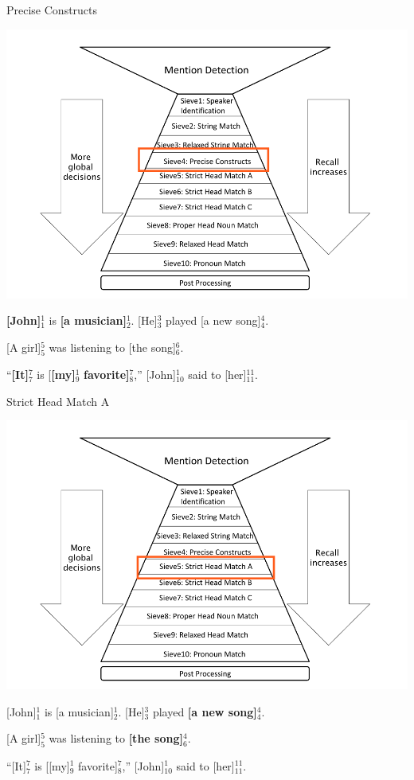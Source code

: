 \documentclass[11pt,a4paper]{beamer}
\begin{document}
\begin{frame}{Precise Constructs}

\includegraphics[scale=0.15]{sieve4.png} 
\bigskip

\textbf{[John]}$^{1}_{1}$ is \textbf{[a musician]}$^{1}_{2}$. [He]$^{3}_{3}$ played [a new song]$^{4}_{4}$.

[A girl]$^{5}_{5}$ was listening to [the song]$^{6}_{6}$.

“\textbf{[It]}$^{7}_{7}$ is [\textbf{[my]}$^{1}_{9}$ \textbf{favorite]}$^{7}_{8}$,” [John]$^{1}_{10}$ said to [her]$^{11}_{11}$.

\end{frame}

\begin{frame}{Strict Head Match A}

\includegraphics[scale=0.15]{sieve5.png} 
\bigskip

[John]$^{1}_{1}$ is [a musician]$^{1}_{2}$. [He]$^{3}_{3}$ played \textbf{[a new song]}$^{4}_{4}$.

[A girl]$^{5}_{5}$ was listening to \textbf{[the song]}$^{4}_{6}$.

“[It]$^{7}_{7}$ is [[my]$^{1}_{9}$ favorite]$^{7}_{8}$,” [John]$^{1}_{10}$ said to [her]$^{11}_{11}$.

\end{frame}
\end{document}
